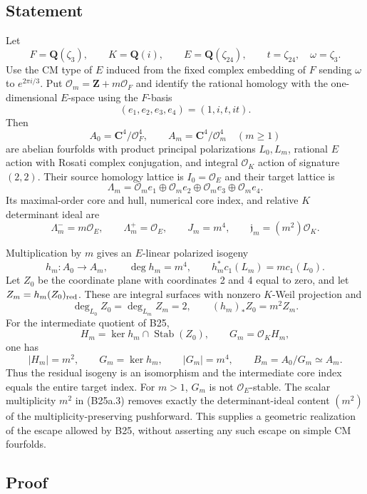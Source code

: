 \documentclass[11pt,a4paper]{article}
\theoremstyle{definition}
\begin{document}
\subsection{Statement}\label{statement}

Let \[
 F=\mathbf Q(\zeta_3),\qquad K=\mathbf Q(i),\qquad
 E=\mathbf Q(\zeta_{24}),\qquad t=\zeta_{24},\quad \omega=\zeta_3.
\] Use the CM type of \(E\) induced from the fixed complex embedding of \(F\) sending \(\omega\) to \(e^{2\pi i/3}\). Put \(\mathcal O_m=\mathbf Z+m\mathcal O_F\) and identify the rational homology with the one-dimensional \(E\)-space using the \(F\)-basis \[
 (e_1,e_2,e_3,e_4)=(1,i,t,it).
\] Then \[
 A_0=\mathbf C^4/\mathcal O_F^4,\qquad
 A_m=\mathbf C^4/\mathcal O_m^4\quad(m\ge1)
\] are abelian fourfolds with product principal polarizations \(L_0,L_m\), rational \(E\) action with Rosati complex conjugation, and integral \(\mathcal O_K\) action of signature \((2,2)\). Their source homology lattice is \(I_0=\mathcal O_E\) and their target lattice is \[
 \Lambda_m=\mathcal O_m e_1\oplus\mathcal O_m e_2
              \oplus\mathcal O_m e_3\oplus\mathcal O_m e_4.
\] Its maximal-order core and hull, numerical core index, and relative \(K\) determinant ideal are \[
 \Lambda_m^-=m\mathcal O_E,\qquad \Lambda_m^+=\mathcal O_E,
 \qquad J_m=m^4,
 \qquad \mathfrak j_m=(m^2)\mathcal O_K.
\tag{B25a.1}
\]

Multiplication by \(m\) gives an \(E\)-linear polarized isogeny \[
 h_m:A_0\longrightarrow A_m,\qquad
 \deg h_m=m^4,
 \qquad h_m^*c_1(L_m)=m c_1(L_0).
\tag{B25a.2}
\] Let \(Z_0\) be the coordinate plane with coordinates 2 and 4 equal to zero, and let \(Z_m=h_m(Z_0)_{\rm red}\). These are integral surfaces with nonzero \(K\)-Weil projection and \[
 \deg_{L_0}Z_0=\deg_{L_m}Z_m=2,
 \qquad (h_m)_*Z_0=m^2 Z_m.
\tag{B25a.3}
\] For the intermediate quotient of B25, \[
 H_m=\ker h_m\cap\operatorname{Stab}(Z_0),\qquad
 G_m=\mathcal O_K H_m,
\] one has \[
 |H_m|=m^2,\qquad
 G_m=\ker h_m,\qquad |G_m|=m^4,
 \qquad B_m=A_0/G_m\simeq A_m.
\tag{B25a.4}
\] Thus the residual isogeny is an isomorphism and the intermediate core index equals the entire target index. For \(m>1\), \(G_m\) is not \(\mathcal O_E\)-stable. The scalar multiplicity \(m^2\) in (B25a.3) removes exactly the determinant-ideal content \((m^2)\) of the multiplicity-preserving pushforward. This supplies a geometric realization of the escape allowed by B25, without asserting any such escape on simple CM fourfolds.

\subsection{Proof}\label{quotient_escape_example_proofs-proof}
\end{document}
